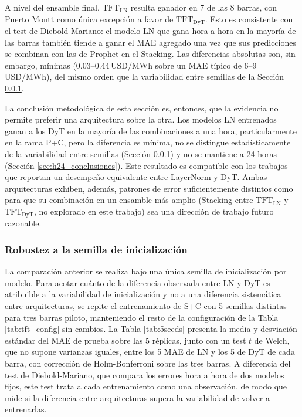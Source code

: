 A nivel del ensamble final, $\text{TFT}_\text{LN}$ resulta ganador en 7 de las 8 barras, con Puerto Montt como única excepción a favor de $\text{TFT}_\text{DyT}$. Esto es consistente con el test de Diebold-Mariano: el modelo LN que gana hora a hora en la mayoría de las barras también tiende a ganar el MAE agregado una vez que sus predicciones se combinan con las de Prophet en el Stacking. Las diferencias absolutas son, sin embargo, mínimas (0.03--0.44\,USD/MWh sobre un MAE típico de 6--9\,USD/MWh), del mismo orden que la variabilidad entre semillas de la Sección \ref{sec:seeds_ln_dyt}.

La conclusión metodológica de esta sección es, entonces, que la evidencia no permite preferir una arquitectura sobre la otra. Los modelos LN entrenados ganan a los DyT en la mayoría de las combinaciones a una hora, particularmente en la rama P+C, pero la diferencia es mínima, no se distingue estadísticamente de la variabilidad entre semillas (Sección \ref{sec:seeds_ln_dyt}) y no se mantiene a 24 horas (Sección \ref{sec:h24_conclusiones}). Este resultado es compatible con los trabajos que reportan un desempeño equivalente entre LayerNorm y DyT. Ambas arquitecturas exhiben, además, patrones de error suficientemente distintos como para que su combinación en un ensamble más amplio (Stacking entre $\text{TFT}_\text{LN}$ y $\text{TFT}_\text{DyT}$, no explorado en este trabajo) sea una dirección de trabajo futuro razonable.

\subsubsection{Robustez a la semilla de inicialización}
\label{sec:seeds_ln_dyt}

La comparación anterior se realiza bajo una única semilla de inicialización por modelo. Para acotar cuánto de la diferencia observada entre LN y DyT es atribuible a la variabilidad de inicialización y no a una diferencia sistemática entre arquitecturas, se repite el entrenamiento de S+C con 5 semillas distintas para tres barras piloto, manteniendo el resto de la configuración de la Tabla \ref{tab:tft_config} sin cambios. La Tabla \ref{tab:5seeds} presenta la media y desviación estándar del MAE de prueba sobre las 5 réplicas, junto con un test $t$ de Welch, que no supone varianzas iguales, entre los 5 MAE de LN y los 5 de DyT de cada barra, con corrección de Holm-Bonferroni sobre las tres barras. A diferencia del test de Diebold-Mariano, que compara los errores hora a hora de dos modelos fijos, este test trata a cada entrenamiento como una observación, de modo que mide si la diferencia entre arquitecturas supera la variabilidad de volver a entrenarlas.

